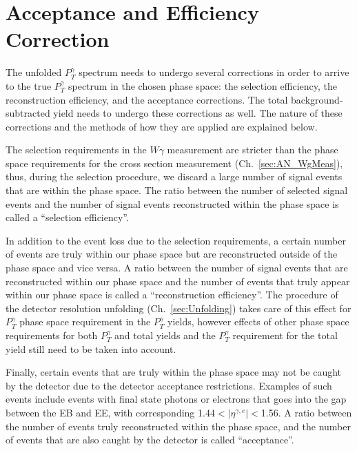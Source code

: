 \section{Acceptance and Efficiency Correction}
\label{sec:AccXEff}


The unfolded $P_T^{\gamma}$ spectrum needs to undergo several corrections in order to arrive to the true $P_T^{\gamma}$ spectrum in the chosen phase space: the selection efficiency, the reconstruction efficiency, and the acceptance corrections. The total background-subtracted yield needs to undergo these corrections as well. The nature of these corrections and the methods of how they are applied are explained below.

The selection requirements in the $W\gamma$ measurement are stricter than the phase space requirements for the cross section measurement (Ch.~\ref{sec:AN_WgMeas}), thus, during the selection procedure, we discard a large number of signal events that are within the phase space. The ratio between the number of selected signal events and the number of signal events reconstructed within the phase space is called a ``selection efficiency''. 

In addition to the event loss due to the selection requirements, a certain number of events are truly within our phase space but are reconstructed outside of the phase space and vice versa. A ratio between the number of signal events that are reconstructed within our phase space and the number of events that truly appear within our phase space is called a ``reconstruction efficiency''. The procedure of the detector resolution unfolding (Ch.~\ref{sec:Unfolding}) takes care of this effect for $P_T^{\gamma}$ phase space requirement in the $P_T^{\gamma}$ yields, however effects of other phase space requirements for both $P_T^{\gamma}$ and total yields and the $P_T^{\gamma}$ requirement for the total yield still need to be taken into account.

Finally, certain events that are truly within the phase space may not be caught by the detector due to the detector acceptance restrictions. Examples of such events include events with final state photons or electrons that goes into the gap between the EB and EE, with corresponding 1.44$<|\eta^{\gamma,e}|<$1.56. A ratio between the number of events truly reconstructed within the phase space, and the number of events that are also caught by the detector is called ``acceptance''.  


